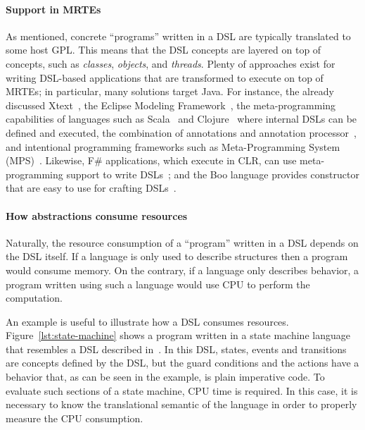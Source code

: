 \paragraph{Support in MRTEs} 
As mentioned, concrete ``programs'' written in a DSL are typically translated to some host GPL.
This means that the DSL concepts are layered on top of concepts, such as \textit{classes}, \textit{objects}, and \textit{threads}.
Plenty of approaches exist for writing DSL-based applications that are transformed to execute on top of MRTEs; in particular, many solutions target Java.
For instance, the already discussed Xtext~\cite{Eysholdt:2010:XIY:1869542.1869625}, the Eclipse Modeling Framework~\cite{EMFModeling}, the meta-programming capabilities of languages such as Scala~\cite{Hofer:2010:MDL:1868294.1868307} and Clojure~\cite{Kelker2013} where internal DSLs can be defined and executed, the combination of annotations and annotation processor~\cite{Huang2008}, and intentional programming frameworks such as Meta-Programming System (MPS)~\cite{JetBrainsMetaProgrammingSystem(MPS),Voelter2014}.
Likewise, F\# applications, which execute in CLR, can use meta-programming support to write DSLs~\cite{Cheney:2013:PTL:2500365.2500586}; and the Boo language provides constructor that are easy to use for crafting DSLs~\cite{Rahien2010}. 

\paragraph{How abstractions consume resources} 
Naturally, the resource consumption of a ``program'' written in a DSL depends on the DSL itself.
If a language is only used to describe structures then a program would consume memory.
On the contrary, if a language only describes behavior, a program written using such a language would use CPU to perform the computation.

An example is useful to illustrate how a DSL consumes resources.
Figure~\ref{lst:state-machine} shows a program written in a state machine language that resembles a DSL described in~\cite{Voelter2010}.
In this DSL, states, events and transitions are concepts defined by the DSL, but the guard conditions and the actions have a behavior that, as can be seen in the example, is plain imperative code.
To evaluate such sections of a state machine, CPU time is required.
In this case, it is necessary to know the translational semantic of the language in order to properly measure the CPU consumption.


